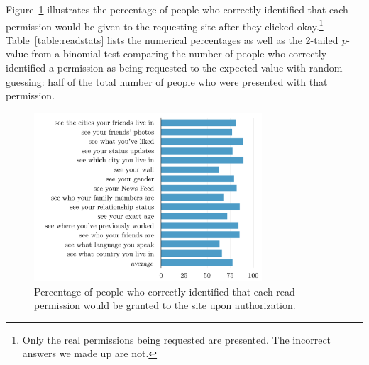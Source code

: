 \documentclass{sig-alternate}
\begin{document}
Figure~\ref{figure:readpercents} illustrates the percentage of people who correctly identified that each permission would be given to the requesting site after they clicked okay.\footnote{Only the real permissions being requested are presented. The incorrect answers we made up are not.} Table~\ref{table:readstats} lists the numerical percentages as well as the 2-tailed \emph{p}-value from a binomial test comparing the number of people who correctly identified a permission as being requested to the expected value with random guessing: half of the total number of people who were presented with that permission.

\begin{figure}[tb!]
  \centering
  \includegraphics[width=8.5cm]{read_percents_cosn}
  \caption{Percentage of people who correctly identified that each read permission would be granted to the site upon authorization.}
  \label{figure:readpercents}
\end{figure}
\end{document}
